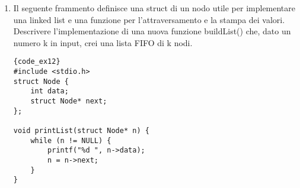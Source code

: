 \begin{enumerate}
\begin{minipage}{.40\textwidth}
\begin{lstlisting}{code_ex11}
#include <stdio.h>
int main(void) {
    char s[] = "stampa la stringa";
    for (; *s != '\0'; ++s) {
        printf("%c", *s);
    }
}
\end{lstlisting}
\end{minipage}\hfill
\begin{minipage}[t]{.50\textwidth}
\end{minipage}



\vspace{1.4cm}
\item {} Il seguente frammento definisce una struct di un nodo utile per implementare una linked list e una funzione per l’attraversamento e la stampa dei valori.
Descrivere l’implementazione di una nuova funzione buildList() che, dato un numero k in input, crei una lista FIFO di k nodi.

\begin{minipage}{.40\textwidth}
\begin{lstlisting}{code_ex12}
#include <stdio.h> 
struct Node { 
    int data; 
    struct Node* next; 
}; 

void printList(struct Node* n) { 
    while (n != NULL) { 
        printf("%d ", n->data); 
        n = n->next; 
    } 
} 
\end{lstlisting}
\end{minipage}\hfill
\begin{minipage}[t]{.50\textwidth}
\end{minipage}



\end{enumerate}
